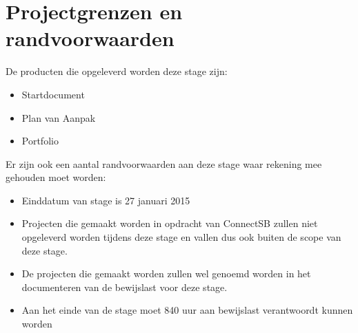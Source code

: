 
\section{Projectgrenzen en randvoorwaarden}
De producten die opgeleverd worden deze stage zijn:
\begin{itemize}
\item Startdocument
\item Plan van Aanpak
\item Portfolio
\end{itemize}

Er zijn ook een aantal randvoorwaarden aan deze stage waar rekening mee gehouden moet worden:
\begin{itemize}
\item Einddatum van stage is 27 januari 2015
\item Projecten die gemaakt worden in opdracht van ConnectSB zullen niet opgeleverd worden tijdens deze stage en vallen dus ook buiten de scope van deze stage.
\item De projecten die gemaakt worden zullen wel genoemd worden in het documenteren van de bewijslast voor deze stage.
\item Aan het einde van de stage moet 840 uur aan bewijslast verantwoordt kunnen worden
\end{itemize}

\clearpage

